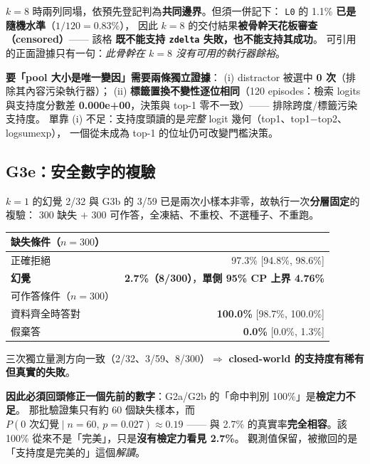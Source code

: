 \documentclass[11pt, a4paper]{article}
\begin{document}
$k{=}8$ 時兩列同塌，依預先登記判為\textbf{共同邊界}。但須一併記下：
\verb|L0| 的 1.1\% \textbf{已是隨機水準}（$1/120 = 0.83\%$），
因此 $k{=}8$ 的交付結果\textbf{被骨幹天花板審查（censored）}—— 該格
\textbf{既不能支持 \texttt{zdelta} 失敗，也不能支持其成功}。
可引用的正面證據只有一句：\emph{此骨幹在 $k{=}8$ 沒有可用的執行器餘裕}。

\textbf{要「pool 大小是唯一變因」需要兩條獨立證據}：
(i) distractor 被選中 \textbf{0 次}（排除其內容污染執行器）；
(ii) \textbf{標籤置換不變性逐位相同}（120 episodes：檢索 logits 與支持度分數差
\textbf{0.000e+00}，決策與 top-1 零不一致）—— 排除跨度/標籤污染支持度。
單靠 (i) 不足：支持度頭讀的是\emph{完整} logit 幾何（top1、top1$-$top2、logsumexp），
一個從未成為 top-1 的位址仍可改變門檻決策。

\subsection{G3e：安全數字的複驗}\label{sec:g3e}

$k{=}1$ 的幻覺 2/32 與 G3b 的 3/59 已是兩次小樣本非零，故執行一次\textbf{分層固定}的複驗：
300 缺失 $+$ 300 可作答，全凍結、不重校、不選種子、不重跑。

\begin{table}[h]
\centering
\small
\begin{tabular}{lr}
\toprule
缺失條件（$n{=}300$）& \\
\midrule
正確拒絕 & 97.3\% [94.8\%, 98.6\%] \\
\textbf{幻覺} & \textbf{2.7\%（8/300）}，\textbf{單側 95\% CP 上界 4.76\%} \\
\midrule
可作答條件（$n{=}300$）& \\
\midrule
資料齊全時答對 & \textbf{100.0\%} [98.7\%, 100.0\%] \\
假棄答 & \textbf{0.0\%} [0.0\%, 1.3\%] \\
\bottomrule
\end{tabular}
\end{table}

三次獨立量測方向一致（2/32、3/59、8/300）$\Rightarrow$
\textbf{closed-world 的支持度有稀有但真實的失敗}。

\textbf{因此必須回頭修正一個先前的數字}：G2a/G2b 的「命中判別 100\%」是\textbf{檢定力不足}。
那批驗證集只有約 60 個缺失樣本，而 $P(\text{0 次幻覺} \mid n{=}60,\, p{=}0.027) \approx 0.19$
—— 與 2.7\% 的真實率\textbf{完全相容}。該 100\% 從來不是「完美」，只是\textbf{沒有檢定力看見 2.7\%}。
觀測值保留，被撤回的是「支持度是完美的」這個\emph{解讀}。
\end{document}
